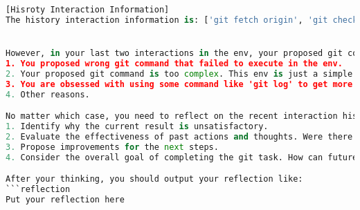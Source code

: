 \begin{lstlisting}[language=Python]
[Hisroty Interaction Information]
The history interaction information is: ['git fetch origin', 'git checkout side1', 'git merge o/main', 'git checkout side2', 'git merge side1', 'git checkout side3', 'git merge side2'].


However, in your last two interactions in the env, your proposed git command doesn't change the state of the git tree. This means that your past two interactions does not contribute to the efficient completion of the git task. You need to reflect on the past two interactions and consider the following possible reasons:
1. You proposed wrong git command that failed to execute in the env.
2. Your proposed git command is too complex. This env is just a simple git sandbox, you don't need to use complex git commands.
3. You are obsessed with using some command like 'git log' to get more information, but it's not necessary in this env because the current state of the git tree has already provided all necessary information.
4. Other reasons.

No matter which case, you need to reflect on the recent interaction history and consider the following points:
1. Identify why the current result is unsatisfactory.
2. Evaluate the effectiveness of past actions and thoughts. Were there missed signals or incorrect assumptions?
3. Propose improvements for the next steps.
4. Consider the overall goal of completing the git task. How can future actions better align with this objective?

After your thinking, you should output your reflection like:
```reflection
Put your reflection here


\end{lstlisting}

